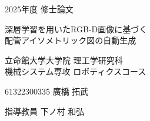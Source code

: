 \begin{titlepage}
  \centering
  \vspace*{2cm}
  
  {\Large 2025年度 修士論文}
  
    \vspace{2cm}
  {\LARGE 深層学習を用いたRGB-D画像に基づく}\\
  \vspace{0.3cm}
  {\LARGE 配管アイソメトリック図の自動生成}
  
  \vfill
  \vspace{5cm}

  {\Large 立命館大学大学院 理工学研究科}\\
  \vspace{0.5cm}
  {\Large 機械システム専攻 ロボティクスコース}
  \vspace{0.5cm}

  
  {\Large 61322300335 廣橋 拓武}
  
  \vspace{3cm}
  
  {\Large 指導教員 下ノ村 和弘}
  
  \vfill
  
  \vspace{1cm}
  
\end{titlepage}